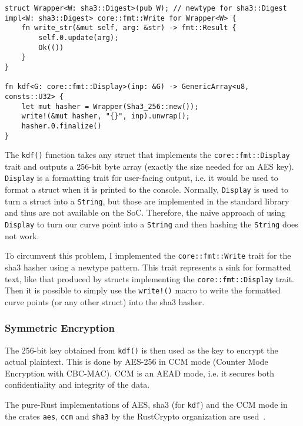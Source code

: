 \begin{lstlisting}[caption={Hash-based key derivation Function for curve points},label={lst:kdf}]
struct Wrapper<W: sha3::Digest>(pub W); // newtype for sha3::Digest
impl<W: sha3::Digest> core::fmt::Write for Wrapper<W> {
    fn write_str(&mut self, arg: &str) -> fmt::Result {
        self.0.update(arg);
        Ok(())
    }
}

fn kdf<G: core::fmt::Display>(inp: &G) -> GenericArray<u8, consts::U32> {
    let mut hasher = Wrapper(Sha3_256::new());
    write!(&mut hasher, "{}", inp).unwrap();
    hasher.0.finalize()
}
\end{lstlisting}

The \verb+kdf()+ function takes any struct that implements the \texttt{core::fmt::Display} trait and outputs a 256-bit byte array (exactly the size needed for an AES key).
\texttt{Display} is a formatting trait for user-facing output, i.e. it would be used to format a struct when it is printed to the console.
Normally, \texttt{Display} is used to turn a struct into a \verb+String+, but those are implemented in the standard library and thus are not available on the SoC.
Therefore, the naive approach of using \texttt{Display} to turn our curve point into a \texttt{String} and then hashing the \texttt{String} does not work.

To circumvent this problem, I implemented the \verb+core::fmt::Write+ trait for the \acrshort{sha3} hasher using a newtype pattern.
This trait represents a sink for formatted text, like that produced by structs implementing the \verb+core::fmt::Display+ trait.
Then it is possible to simply use the \verb+write!()+ macro to write the formatted curve points (or any other struct) into the \acrshort{sha3} hasher.

\subsubsection{Symmetric Encryption}

The 256-bit key obtained from \texttt{kdf()} is then used as the key to encrypt the actual plaintext.
This is done by AES-256 in CCM mode (Counter Mode Encryption with CBC-MAC).
CCM is an AEAD mode, i.e. it secures both confidentiality and integrity of the data.

The pure-Rust implementations of AES, \gls{sha3} (for \texttt{kdf}) and the CCM mode in the crates \texttt{aes}, \texttt{ccm} and \texttt{sha3} by the RustCrypto organization are used~\cite{noauthor_rustcrypto_nodate}.

